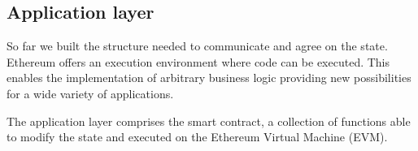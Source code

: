 \subsection{Application layer}

So far we built the structure needed to communicate and agree on the state.
Ethereum offers an execution environment where code can be executed. This
enables the implementation of arbitrary business logic providing new
possibilities for a wide variety of applications.

The application layer comprises the smart contract, a collection of functions
able to modify the state and executed on the Ethereum Virtual Machine (EVM).
